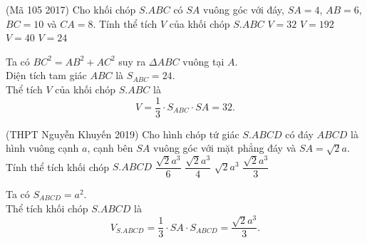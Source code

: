 \begin{ex}%
	(Mã 105 2017) Cho khối chóp $ S.ABC$ có $ SA$ vuông góc với đáy, $ SA=4$, $ AB=6$, $ BC=10$ và $ CA=8$. Tính thể tích $ V$ của khối chóp $ S.ABC$
	\choice
	{\True $ V=32$}
	{$ V=192$}
	{$ V=40$}
	{$ V=24$}
	\loigiai
	{
		\begin{center}
		\end{center}
		Ta có $ BC^2=AB^2+AC^2$ suy ra $\Delta ABC$ vuông tại $A$.\\
		Diện tích tam giác $ABC$ là $S_{ABC}=24.$\\
		Thể tích $V$ của khối chóp $S.ABC$ là
		$$ V=\dfrac{1}{3}\cdot {S_{ABC}}\cdot SA=32.$$}
\end{ex}
%
\begin{ex}%
	(THPT Nguyễn Khuyến 2019) Cho hình chóp tứ giác $S.ABCD$ có đáy $ABCD$ là hình vuông cạnh $a$, cạnh bên $SA$ vuông góc với mặt phẳng đáy và $SA=\sqrt{2}a$. Tính thể tích khối chóp $S.ABCD$
	\choice
	{$\dfrac{\sqrt{2}{a^3}}{6}$}
	{$\dfrac{\sqrt{2}{a^3}}{4}$}
	{$\sqrt{2}{a^3}$}
	{\True $\dfrac{\sqrt{2}{a^3}}{3}$}
	\loigiai
	{
		\begin{center}
		\end{center}
		Ta có $S_{ABCD}=a^2$.\\
		Thể tích khối chóp $S.ABCD$ là $$V_{S.ABCD}=\dfrac{1}{3}\cdot SA\cdot S_{ABCD}=\dfrac{\sqrt{2}{a^3}}{3}.$$}
\end{ex}
%
